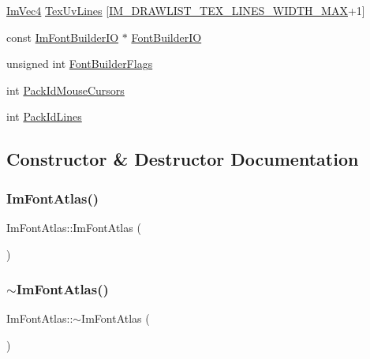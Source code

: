 \begin{DoxyCompactItemize}
\item 
\hyperlink{structImVec4}{Im\+Vec4} \hyperlink{structImFontAtlas_abf794895d5fb9597bf2a96ab68eb7048}{Tex\+Uv\+Lines} \mbox{[}\hyperlink{imgui_8h_a2e0fd3c4182b90dfde08210254eaeccf}{I\+M\+\_\+\+D\+R\+A\+W\+L\+I\+S\+T\+\_\+\+T\+E\+X\+\_\+\+L\+I\+N\+E\+S\+\_\+\+W\+I\+D\+T\+H\+\_\+\+M\+AX}+1\mbox{]}
\item 
const \hyperlink{structImFontBuilderIO}{Im\+Font\+Builder\+IO} $\ast$ \hyperlink{structImFontAtlas_a43337693a61cd40ec0110c83da628f09}{Font\+Builder\+IO}
\item 
unsigned int \hyperlink{structImFontAtlas_ad149b9a00b3dd033c0568abaf45256c3}{Font\+Builder\+Flags}
\item 
int \hyperlink{structImFontAtlas_afc92fd54d52cab4fe787e364e7e4f652}{Pack\+Id\+Mouse\+Cursors}
\item 
int \hyperlink{structImFontAtlas_a0964aa42e665dbd423066309b3c7461b}{Pack\+Id\+Lines}
\end{DoxyCompactItemize}


\subsection{Constructor \& Destructor Documentation}
\mbox{\label{structImFontAtlas_aa34e7909d30440d5c35aaef990ac741e}} 
\subsubsection{\texorpdfstring{Im\+Font\+Atlas()}{ImFontAtlas()}}
{\footnotesize\ttfamily Im\+Font\+Atlas\+::\+Im\+Font\+Atlas (\begin{DoxyParamCaption}{ }\end{DoxyParamCaption})}

\mbox{\label{structImFontAtlas_a950b4f7586ad7786ae251b957d67a268}} 
\subsubsection{\texorpdfstring{$\sim$\+Im\+Font\+Atlas()}{~ImFontAtlas()}}
{\footnotesize\ttfamily Im\+Font\+Atlas\+::$\sim$\+Im\+Font\+Atlas (\begin{DoxyParamCaption}{ }\end{DoxyParamCaption})}



